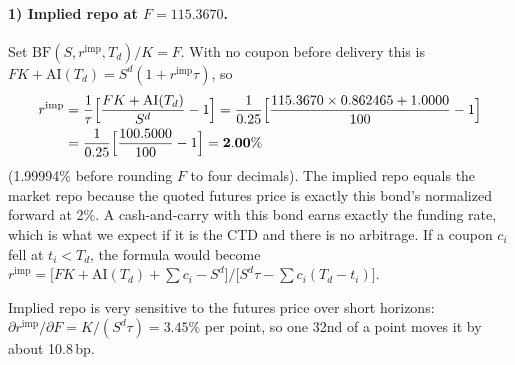 \documentclass[11pt]{article}
\newcommand{\AI}{\mathrm{AI}}
\newcommand{\BF}{\mathrm{BF}}
\begin{document}
\paragraph{1) Implied repo at $F=115.3670$.}
Set $\BF(S,r^{\text{imp}},T_d)/K=F$. With no coupon before delivery this is $F K+\AI(T_d)=S^{d}(1+r^{\text{imp}}\tau)$, so
\begin{align*}
r^{\text{imp}}&=\frac{1}{\tau}\Bigl[\frac{F K+\AI(T_d)}{S^{d}}-1\Bigr]
=\frac{1}{0.25}\Bigl[\frac{115.3670\times0.862465+1.0000}{100}-1\Bigr]\\
&=\frac{1}{0.25}\Bigl[\frac{100.5000}{100}-1\Bigr]=\mathbf{2.00\%}
\end{align*}
(1.99994\% before rounding $F$ to four decimals). The implied repo equals the market repo because the quoted futures price is exactly this bond's normalized forward at 2\%. A cash-and-carry with this bond earns exactly the funding rate, which is what we expect if it is the CTD and there is no arbitrage. If a coupon $c_i$ fell at $t_i<T_d$, the formula would become $r^{\text{imp}}=\bigl[F K+\AI(T_d)+\sum c_i-S^{d}\bigr]/\bigl[S^{d}\tau-\sum c_i(T_d-t_i)\bigr]$.

Implied repo is very sensitive to the futures price over short horizons: $\partial r^{\text{imp}}/\partial F=K/(S^{d}\tau)=3.45\%$ per point, so one 32nd of a point moves it by about 10.8\,bp.
\end{document}
